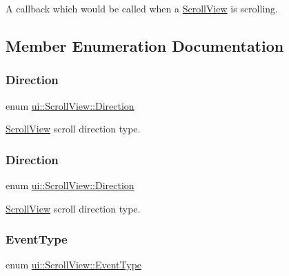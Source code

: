 A callback which would be called when a \hyperlink{classui_1_1ScrollView}{Scroll\+View} is scrolling. 

\subsection{Member Enumeration Documentation}
\mbox{\label{classui_1_1ScrollView_aed2d778ae8098dcafe323b2beae8dd6b}} 
\subsubsection{\texorpdfstring{Direction}{Direction}\hspace{0.1cm}{\footnotesize\ttfamily [1/2]}}
{\footnotesize\ttfamily enum \hyperlink{classui_1_1ScrollView_aed2d778ae8098dcafe323b2beae8dd6b}{ui\+::\+Scroll\+View\+::\+Direction}\hspace{0.3cm}{\ttfamily [strong]}}

\hyperlink{classui_1_1ScrollView}{Scroll\+View} scroll direction type. \mbox{\label{classui_1_1ScrollView_aed2d778ae8098dcafe323b2beae8dd6b}} 
\subsubsection{\texorpdfstring{Direction}{Direction}\hspace{0.1cm}{\footnotesize\ttfamily [2/2]}}
{\footnotesize\ttfamily enum \hyperlink{classui_1_1ScrollView_aed2d778ae8098dcafe323b2beae8dd6b}{ui\+::\+Scroll\+View\+::\+Direction}\hspace{0.3cm}{\ttfamily [strong]}}

\hyperlink{classui_1_1ScrollView}{Scroll\+View} scroll direction type. \mbox{\label{classui_1_1ScrollView_ac2a08f5665cbbfbff86fe7abdb6fbb02}} 
\subsubsection{\texorpdfstring{Event\+Type}{EventType}\hspace{0.1cm}{\footnotesize\ttfamily [1/2]}}
{\footnotesize\ttfamily enum \hyperlink{classui_1_1ScrollView_ac2a08f5665cbbfbff86fe7abdb6fbb02}{ui\+::\+Scroll\+View\+::\+Event\+Type}\hspace{0.3cm}{\ttfamily [strong]}}

